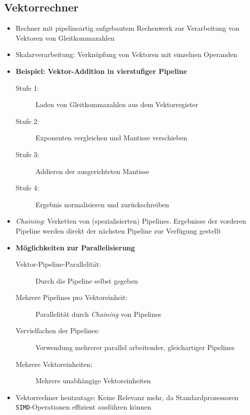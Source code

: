 \subsection{Vektorrechner}
\begin{itemize}
	\item Rechner mit pipelineartig aufgebautem Rechenwerk zur Verarbeitung von Vektoren von Gleitkommazahlen
	\item Skalarverarbeitung: Verknüpfung von Vektoren mit einzelnen Operanden
	\item \textbf{Beispiel: Vektor-Addition in vierstufiger Pipeline}
	\begin{description}
		\item[Stufe 1:] Laden von Gleitkommazahlen aus dem Vektorregister
		\item[Stufe 2:] Exponenten vergleichen und Mantisse verschieben
		\item[Stufe 3:] Addieren der ausgerichteten Mantisse
		\item[Stufe 4:] Ergebnis normalisieren und zurückschreiben
	\end{description}
	\item \textit{Chaining}: Verketten von (spezialisierten) Pipelines. Ergebnisse der vorderen Pipeline werden direkt der nächsten Pipeline zur Verfügung gestellt
	\item \textbf{Möglichkeiten zur Parallelisierung}
	\begin{description}
		\item[Vektor-Pipeline-Parallelität:] Durch die Pipeline selbst gegeben
		\item[Mehrere Pipelines pro Vektoreinheit:] Parallelität durch \textit{Chaining} von Pipelines
		\item[Vervielfachen der Pipelines:] Verwendung mehrerer parallel arbeitender, gleichartiger Pipelines
		\item[Mehrere Vektoreinheiten:] Mehrere unabhängige Vektoreinheiten
	\end{description}
	\item Vektorrechner heutzutage: Keine Relevanz mehr, da Standardprozessoren \texttt{SIMD}-Operationen effizient ausführen können
\end{itemize}

